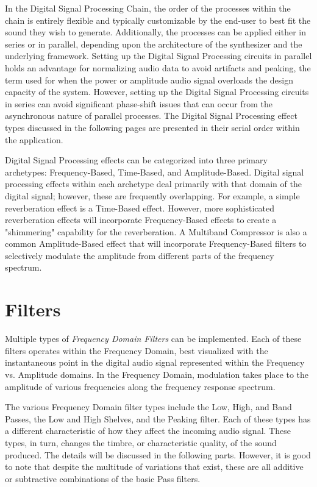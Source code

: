 \documentclass[a4paper,12pt]{report}
\begin{document}
In the Digital Signal Processing Chain, the order of the processes within the chain is entirely flexible and typically customizable by the end-user to best fit the sound they wish to generate. Additionally, the processes can be applied either in series or in parallel, depending upon the architecture of the synthesizer and the underlying framework. Setting up the Digital Signal Processing circuits in parallel holds an advantage for normalizing audio data to avoid artifacts and peaking, the term used for when the power or amplitude audio signal overloads the design capacity of the system. However, setting up the Digital Signal Processing circuits in series can avoid significant phase-shift issues that can occur from the asynchronous nature of parallel processes. The Digital Signal Processing effect types discussed in the following pages are presented in their serial order within the application.

Digital Signal Processing effects can be categorized into three primary archetypes: Frequency-Based, Time-Based, and Amplitude-Based. Digital signal processing effects within each archetype deal primarily with that domain of the digital signal; however, these are frequently overlapping. For example, a simple reverberation effect is a Time-Based effect. However, more sophisticated reverberation effects will incorporate Frequency-Based effects to create a "shimmering" capability for the reverberation. A Multiband Compressor is also a common Amplitude-Based effect that will incorporate Frequency-Based filters to selectively modulate the amplitude from different parts of the frequency spectrum.

\section{Filters}
\label{sec:filters}
Multiple types of \emph{Frequency Domain Filters} can be implemented. Each of these filters operates within the Frequency Domain, best visualized with the instantaneous point in the digital audio signal represented within the Frequency vs. Amplitude domains. In the Frequency Domain, modulation takes place to the amplitude of various frequencies along the frequency response spectrum. 

The various Frequency Domain filter types include the Low, High, and Band Passes, the Low and High Shelves, and the Peaking filter. Each of these types has a different characteristic of how they affect the incoming audio signal. These types, in turn, changes the timbre, or characteristic quality, of the sound produced. The details will be discussed in the following parts. However, it is good to note that despite the multitude of variations that exist, these are all additive or subtractive combinations of the basic Pass filters.
\end{document}
